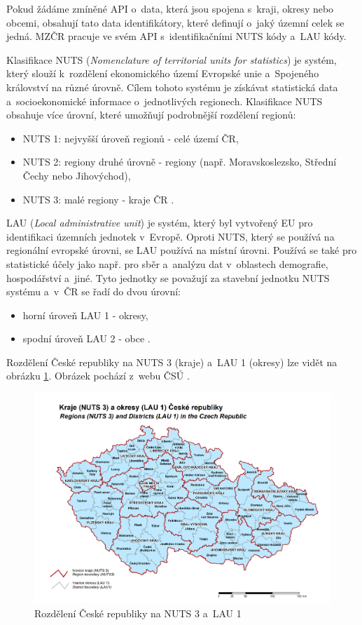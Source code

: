 Pokud žádáme zmíněné API o~data, která jsou spojena s~kraji, okresy nebo obcemi, obsahují tato data identifikátory, které definují o~jaký územní celek se jedná. MZČR pracuje ve svém API s~identifikačními NUTS kódy a~LAU kódy.

Klasifikace NUTS (\emph{Nomenclature of territorial units for statistics}) je systém, který slouží k~rozdělení ekonomického území Evropské unie a~Spojeného království na různé úrovně. Cílem tohoto systému je získávat statistická data a~socioekonomické informace o~jednotlivých regionech. Klasifikace NUTS obsahuje více úrovní, které umožňují podrobnější rozdělení regionů:

\begin{itemize}
    \item NUTS 1: nejvyšší úroveň regionů - celé území ČR,
    \item NUTS 2: regiony druhé úrovně - regiony (např. Moravskoslezsko, Střední Čechy nebo Jihovýchod),
    \item NUTS 3: malé regiony - kraje ČR \cite{europa-eu-nuts}.
\end{itemize}

LAU (\emph{Local administrative unit}) je systém, který byl vytvořený EU pro identifikaci územních jednotek v~Evropě. Oproti NUTS, který se používá na regionální evropské úrovni, se LAU používá na místní úrovni. Používá se také pro statistické účely jako např. pro sběr a~analýzu dat v~oblastech demografie, hospodářství a~jiné. Tyto jednotky se považují za stavební jednotku NUTS systému a~v~ČR se řadí do dvou úrovní:

\begin{itemize}
    \item horní úroveň LAU 1 - okresy,
    \item spodní úroveň LAU 2 - obce \cite{csu-lau}.
\end{itemize}

Rozdělení České republiky na NUTS 3 (kraje) a~LAU 1 (okresy) lze vidět na obrázku \ref{fig:NutsLau}. Obrázek pochází z~webu ČSÚ \cite{nuts-lau-pic}.

\begin{figure}[h]
	\centering
	\includegraphics[width=1\textwidth]{Pictures/nuts_lau.png}
	\caption{Rozdělení České republiky na NUTS 3 a~LAU 1 \cite{nuts-lau-pic}}
	\label{fig:NutsLau}
\end{figure}

